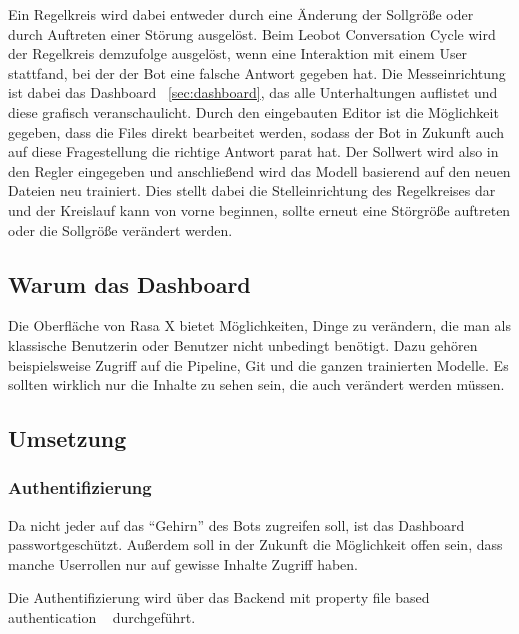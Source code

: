 Ein Regelkreis wird dabei entweder durch eine Änderung der Sollgröße oder durch Auftreten einer Störung ausgelöst.
Beim Leobot Conversation Cycle wird der Regelkreis demzufolge ausgelöst, wenn eine Interaktion mit einem User stattfand, bei der der Bot eine falsche Antwort gegeben hat.
Die Messeinrichtung ist dabei das Dashboard ~\ref{sec:dashboard}, das alle Unterhaltungen auflistet und diese grafisch veranschaulicht.
Durch den eingebauten Editor ist die Möglichkeit gegeben, dass die Files direkt bearbeitet werden, sodass der Bot in Zukunft auch auf diese Fragestellung die richtige Antwort parat hat.
Der Sollwert wird also in den Regler eingegeben und anschließend wird das Modell basierend auf den neuen Dateien neu trainiert.
Dies stellt dabei die Stelleinrichtung des Regelkreises dar und der Kreislauf kann von vorne beginnen, sollte erneut eine Störgröße auftreten oder die Sollgröße verändert werden.


\subsection{Warum das Dashboard}

Die Oberfläche von Rasa X bietet Möglichkeiten, Dinge zu verändern, die man als klassische Benutzerin oder Benutzer nicht unbedingt benötigt.
Dazu gehören beispielsweise Zugriff auf die Pipeline, Git und die ganzen trainierten Modelle.
Es sollten wirklich nur die Inhalte zu sehen sein, die auch verändert werden müssen.

\subsection{Umsetzung}

\subsubsection{Authentifizierung}
Da nicht jeder auf das ``Gehirn'' des Bots zugreifen soll, ist das Dashboard passwortgeschützt.
Außerdem soll in der Zukunft die Möglichkeit offen sein, dass manche Userrollen nur auf gewisse Inhalte Zugriff haben.

Die Authentifizierung wird über das Backend mit property file based authentication ~\cite{authentication} durchgeführt.

